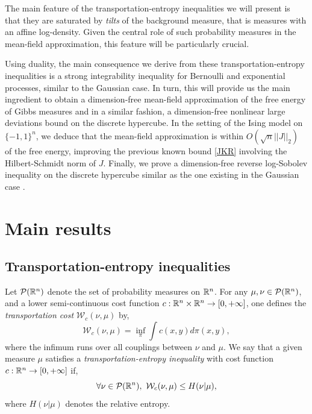 \documentclass[a4paper,oneside,11pt]{article}
\begin{document}
The main feature of the transportation-entropy inequalities we will present is that they are saturated by \textit{tilts} of the background measure, that is  measures with an affine log-density. Given the central role of such probability measures in the mean-field approximation, this feature will be particularly crucial. 

Using duality, the main consequence we derive from these transportation-entropy inequalities is a strong integrability inequality for Bernoulli and exponential processes, similar to the Gaussian case. In turn, this will provide us the main ingredient to obtain a dimension-free mean-field approximation of the free energy of Gibbs measures and in a similar fashion, a dimension-free nonlinear large deviations bound on the discrete hypercube.
In the setting of the Ising model on $\{-1,1\}^n$, we deduce that the mean-field approximation is within $O( \sqrt{n} ||J||_2)$ of the free energy, improving  the previous known bound \eqref{JKR} involving the Hilbert-Schmidt norm of $J$. Finally, we prove a dimension-free reverse log-Sobolev inequality on the discrete hypercube similar as the one existing in the Gaussian case \cite{LedouxE}.



\section{Main results}

\subsection{Transportation-entropy inequalities}
Let $\mathcal{P}(\mathbb{R}^n)$ denote the set of probability measures on $\mathbb{R}^n$. For any $\mu, \nu \in \mathcal{P}(\mathbb{R}^n)$, and a lower semi-continuous cost function $c : \mathbb{R}^n \times \mathbb{R}^n \to [0,+\infty]$, one defines the \textit{transportation cost} $\mathcal{W}_c(\nu,\mu)$ by,
$$ \mathcal{W}_c(\nu,\mu)= \inf_{\pi} \int c(x,y) d\pi(x,y),$$
where the infimum runs over all couplings between $\nu$ and $\mu$. We say that a given measure $\mu$ satisfies a \textit{transportation-entropy inequality} with cost function $c : \mathbb{R}^n \to [0,+\infty]$ if,
\begin{equation} \label{transpoin} \forall \nu \in \mathcal{P}(\mathbb{R}^n), \   \mathcal{W}_c(\nu,\mu) \leq H(\nu|\mu),\end{equation}
where $H(\nu|\mu)$ denotes the relative entropy. 
\end{document}
